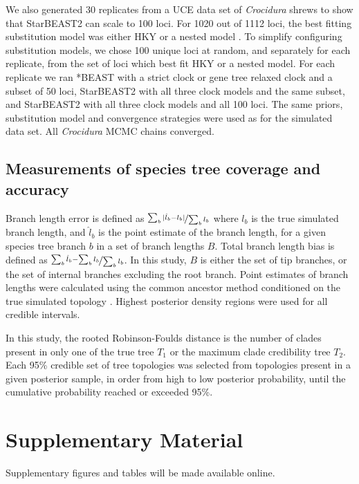 \documentclass[nogrid]{MBE}%
\begin{document}
We also generated 30 replicates from a UCE data set of \textit{Crocidura}
shrews to show that StarBEAST2 can scale to 100 loci. For 1020 out of 1112
loci, the best fitting substitution model was either HKY or a nested model
\citep{Giarla01092015}. To simplify configuring substitution models, we chose
100 unique loci at random, and separately for each replicate, from the set of
loci which best fit HKY or a nested model. For each replicate we ran *BEAST
with a strict clock or gene tree relaxed clock and a subset of 50 loci,
StarBEAST2 with all three clock models and the same subset, and StarBEAST2
with all three clock models and all 100 loci. The same priors, substitution
model and convergence strategies were used as for the simulated data set.
All \textit{Crocidura} MCMC chains converged.

\subsection{Measurements of species tree coverage and accuracy}

Branch length error is defined as $\nicefrac{\sum_b{\lvert\hat{l}_b -
l_b\rvert}}{\sum_b{l_b}}$ where $l_b$ is the true simulated branch length, and
$\hat{l}_b$ is the point estimate of the branch length, for a given species
tree branch $b$ in a set of branch lengths $B$. Total branch length bias is
defined as $\nicefrac{\sum_b{\hat{l}_b} - \sum_b{l_b}}{\sum_b{l_b}}$. In this
study, $B$ is either the set of tip branches, or the set of internal branches
excluding the root branch. Point estimates of branch lengths were calculated
using the common ancestor method conditioned on the true simulated topology
\citep{Heled2013}. Highest posterior density regions were used for all
credible intervals.

In this study, the rooted Robinson-Foulds distance \citep{ROBINSON1981131} is
the number of clades present in only one of the true tree $T_1$ or the maximum
clade credibility tree $T_2$. Each 95\% credible set of tree topologies was
selected from topologies present in a given posterior sample, in order from high
to low posterior probability, until the cumulative probability
reached or exceeded 95\%.

\section{Supplementary Material}

Supplementary figures and tables will be made available online.
\end{document}
